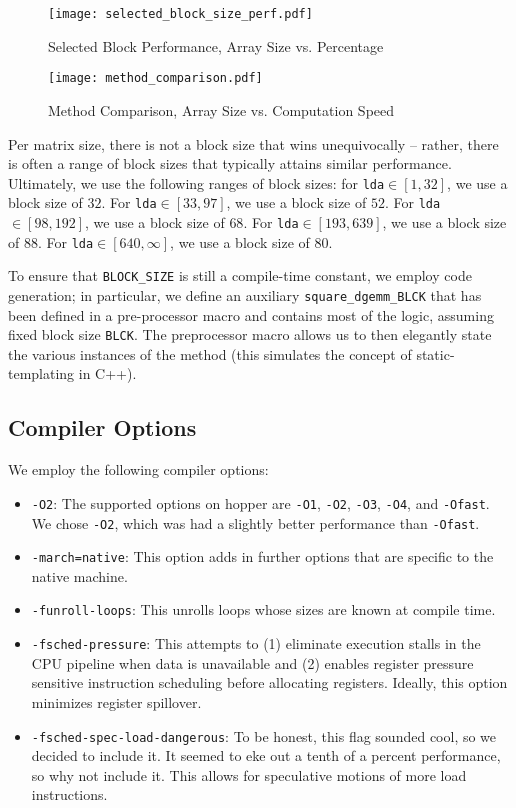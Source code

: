 \documentclass{article} %
\begin{document}
\begin{figure}
 \noindent
 \texttt{[image: selected\_block\_size\_perf.pdf]}
 \caption{Selected Block Performance, Array Size vs. Percentage}
\end{figure}

\begin{figure}
 \noindent
 \texttt{[image: method\_comparison.pdf]}
 \caption{Method Comparison, Array Size vs. Computation Speed}
\end{figure}

Per matrix size, there is not a block size
that wins unequivocally -- rather, there is often a range of block sizes that typically
attains similar performance. Ultimately, we use the following ranges of block sizes:
for \texttt{lda}$\in [1, 32]$, we use a block size of $32$. For \texttt{lda}$\in [33, 97]$,
we use a block size of $52$. For \texttt{lda}$\in [98, 192]$, we use a block size of $68$.
For \texttt{lda}$\in [193, 639]$, we use a block size of $88$. For \texttt{lda}$\in [640, \infty]$,
we use a block size of $80$.

To ensure that \texttt{BLOCK\_SIZE} is still a compile-time constant, we employ
code generation; in particular, we define an auxiliary \texttt{square\_dgemm\_BLCK} that
has been defined in a pre-processor macro and contains most of the logic, assuming fixed block
size \texttt{BLCK}. The preprocessor macro allows us to then elegantly state the various
instances of the method (this simulates the concept of static-templating in C++).

\subsection{Compiler Options}
We employ the following compiler options:
\begin{itemize}
  \item \texttt{-O2}: The supported options on hopper are \texttt{-O1}, \texttt{-O2},
    \texttt{-O3}, \texttt{-O4}, and \texttt{-Ofast}.
    We chose \texttt{-O2}, which was had a slightly better performance than \texttt{-Ofast}.
  \item \texttt{-march=native}: This option adds in further options that are
    specific to the native machine.
  \item \texttt{-funroll-loops}: This unrolls loops whose sizes are known at
    compile time.
  \item \texttt{-fsched-pressure}: This attempts to (1) eliminate execution
    stalls in the CPU pipeline when data is unavailable and (2) enables register
    pressure sensitive instruction scheduling before allocating registers.
    Ideally, this option minimizes register spillover.
  \item \texttt{-fsched-spec-load-dangerous}: To be honest, this flag sounded
    cool, so we decided to include it. It seemed to eke out a tenth of a percent
    performance, so why not include it. This allows for speculative motions of
    more load instructions.
\end{itemize}
\end{document}
